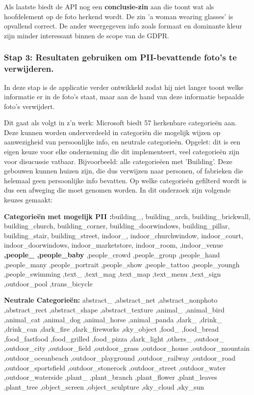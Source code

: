Als laatste biedt de API nog een \textbf{conclusie-zin} aan die toont wat als hoofdelement op de foto herkend wordt. De zin 'a woman wearing glasses' is opvallend correct. 
De ander weergegeven info zoals formaat en dominante kleur zijn minder interessant binnen de scope van de GDPR.

\subsubsection{Stap 3: Resultaten gebruiken om PII-bevattende foto's te verwijderen.}
In deze stap is de applicatie verder ontwikkeld zodat hij niet langer toont welke informatie er in de foto's staat, maar aan de hand van deze informatie bepaalde foto's verwijdert. 

Dit gaat als volgt in z'n werk: Microsoft biedt 57 herkenbare categorieën aan. Deze kunnen worden onderverdeeld in categoriën die mogelijk wijzen op aanwezigheid van persoonlijke info, en neutrale categorieën. Opgelet: dit is een eigen keuze voor elke onderneming die dit implementeert, veel categorieën zijn voor disucussie vatbaar. Bijvoorbeeld: alle categorieëen met 'Building'. Deze gebouwen kunnen huizen zijn, die dus verwijzen naar personen, of fabrieken die helemaal geen persoonlijke info bevatten. Op welke categorieën gefilterd wordt is dus een afweging die moet genomen worden. 
In dit onderzoek zijn volgende keuzes gemaakt: 

\textbf{Categorieën met mogelijk PII :}building\_, building\_arch, building\_brickwall, building\_church, building\_corner, building\_doorwindows, building\_pillar, building\_stair, building\_street, indoor\_, indoor\_churchwindow, indoor\_court, indoor\_doorwindows, indoor\_marketstore,
indoor\_room, 
,indoor\_venue \textbf{,people\_ ,people\_baby}
,people\_crowd
,people\_group
,people\_hand
,people\_many
,people\_portrait
,people\_show
,people\_tattoo
,people\_youngh
,people\_swimming
,text\_
,text\_mag
,text\_map
,text\_menu
,text\_sign
,outdoor\_pool ,trans\_bicycle

\textbf{Neutrale Categorieën:} abstract\_
,abstract\_net
,abstract\_nonphoto
,abstract\_rect
,abstract\_shape
,abstract\_texture
,animal\_
,animal\_bird
,animal\_cat
,animal\_dog
,animal\_horse
,animal\_panda
,dark\_
,drink\_
,drink\_can
,dark\_fire
,dark\_fireworks
,sky\_object
,food\_
,food\_bread
,food\_fastfood
,food\_grilled
,food\_pizza
,dark\_light
,others\_
,outdoor\_
,outdoor\_city
,outdoor\_field
,outdoor\_grass
,outdoor\_house
,outdoor\_mountain
,outdoor\_oceanbeach
,outdoor\_playground
,outdoor\_railway
,outdoor\_road
,outdoor\_sportsfield
,outdoor\_stonerock
,outdoor\_street
,outdoor\_water
,outdoor\_waterside
,plant\_
,plant\_branch
,plant\_flower
,plant\_leaves
,plant\_tree
,object\_screen
,object\_sculpture
,sky\_cloud
,sky\_sun


